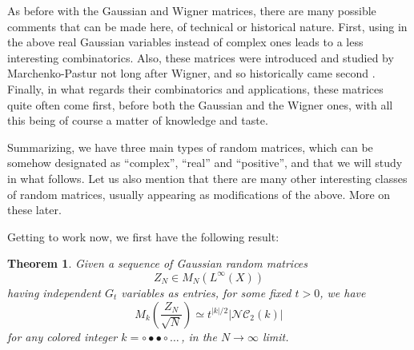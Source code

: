 \documentclass[12pt]{amsbook}
\newtheorem{theorem}{Theorem}[chapter]
\begin{document}
As before with the Gaussian and Wigner matrices, there are many possible comments that can be made here, of technical or historical nature. First, using in the above real Gaussian variables instead of complex ones leads to a less interesting combinatorics. Also, these matrices were introduced and studied by Marchenko-Pastur not long after Wigner, and so historically came second \cite{mpa}. Finally, in what regards their combinatorics and applications, these matrices quite often come first, before both the Gaussian and the Wigner ones, with all this being of course a matter of knowledge and taste.

\bigskip

Summarizing, we have three main types of random matrices, which can be somehow designated as ``complex'', ``real'' and ``positive'', and that we will study in what follows. Let us also mention that there are many other interesting classes of random matrices, usually appearing as modifications of the above. More on these later.

\bigskip

Getting to work now, we first have the following result:

\begin{theorem}
Given a sequence of Gaussian random matrices
$$Z_N\in M_N(L^\infty(X))$$
having independent $G_t$ variables as entries, for some fixed $t>0$, we have
$$M_k\left(\frac{Z_N}{\sqrt{N}}\right)\simeq t^{|k|/2}|\mathcal{NC}_2(k)|$$
for any colored integer $k=\circ\bullet\bullet\circ\ldots\,$, in the $N\to\infty$ limit.
\end{theorem}
\end{document}
